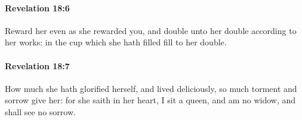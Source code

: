 		\paragraph{Revelation 18:6} %
			\label{REVELATIONNT-18-6}

			Reward her even as she rewarded you, and double unto her double according to her works: in the cup which she hath filled fill to her double.

			\begin{framed}
			\scriptsize
				\begin{compactdesc}
					\item[SBLG] 
				\end{compactdesc}
			\end{framed}

		\paragraph{Revelation 18:7} %
			\label{REVELATIONNT-18-7}

			How much she hath glorified herself, and lived deliciously, so much torment and sorrow give her: for she saith in her heart, I sit a queen, and am no widow, and shall see no sorrow.

